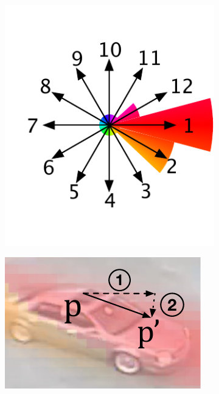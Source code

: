 \begin{figure}
\centering
    \begin{subfigure}{0.26\linewidth}
        \includegraphics[width=\linewidth]{./img/scene_learning/grid_distribution.pdf}
        \subcaption{}
        \label{subfig:scene-grid-dist}
    \end{subfigure}
    \begin{subfigure}{0.35\linewidth}
        \includegraphics[width=\linewidth]{./img/scene_learning/step.pdf}

\end{subfigure}
\end{figure}
